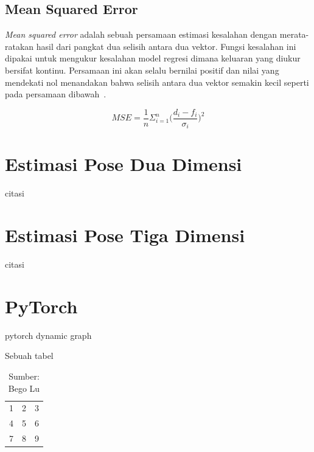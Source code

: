 \subsection{Mean Squared Error}
\textit{Mean squared error} adalah sebuah persamaan estimasi kesalahan dengan merata-ratakan
hasil dari pangkat dua selisih antara dua vektor. Fungsi kesalahan ini dipakai untuk mengukur
kesalahan model regresi dimana keluaran yang diukur bersifat kontinu. Persamaan ini akan selalu
bernilai positif dan nilai yang mendekati nol menandakan bahwa selisih antara dua vektor semakin kecil
seperti pada persamaan dibawah~\cite{TORABI201376}.

\begin{equation*}
    MSE = \frac{1}{n}\Sigma_{i=1}^{n}{\Big(\frac{d_i -f_i}{\sigma_i}\Big)^2}
\end{equation*}

\section{Estimasi Pose Dua Dimensi}
\label{sec:2-EstimasiPoseDuaDimensi}
citasi~\cite{8765346}

\section{Estimasi Pose Tiga Dimensi}
\label{sec:2-EstimasiPoseTigaDimensi}

citasi~\cite{martinez_2017_3dbaseline}

\section{PyTorch}
\label{sec:2-PyTorch}

pytorch dynamic graph

\begin{table}[htbp]
    \captionsetup{labelfont=bf, textfont=bf}
    \caption{Sebuah tabel}
    \vspace{-20pt}
    \begin{center}
        \begin{tabular}{| l c r |}
            \hline
            1 & 2 & 3 \\
            4 & 5 & 6 \\
            7 & 8 & 9 \\
            \hline
        \end{tabular}
    \end{center}
    \vspace{-10pt}
    \captionsetup{labelfont=md, textfont=md}
    \caption*{Sumber: Bego Lu}
\end{table}

